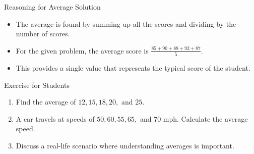 \begin{frame}{Reasoning for Average Solution}
  \begin{itemize}
    \item The average is found by summing up all the scores and dividing by the number of scores.
    \item For the given problem, the average score is $\frac{85 + 90 + 88 + 92 + 87}{5}$.
    \item This provides a single value that represents the typical score of the student.
  \end{itemize}
\end{frame}

\begin{frame}{Exercise for Students}
  \begin{enumerate}
    \item Find the average of $12, 15, 18, 20,$ and $25$.
    \item A car travels at speeds of $50, 60, 55, 65,$ and $70$ mph. Calculate the average speed.
    \item Discuss a real-life scenario where understanding averages is important.
  \end{enumerate}
\end{frame}

